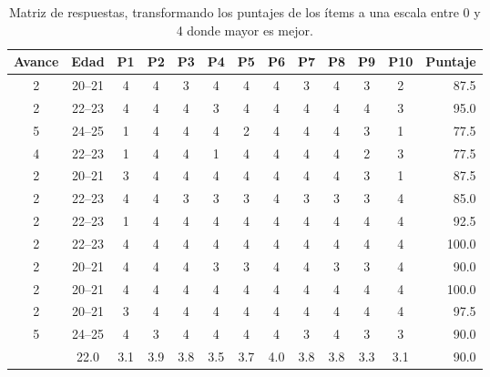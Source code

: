 \begin{table}[hbt]
    \caption[Matriz de respuestas]{Matriz de respuestas, transformando los puntajes de los ítems a una escala entre 0 y 4 donde mayor es mejor.}
    \label{tab:respuestas}
    \centering
    \begin{tabular}{@{}ccccccccccccr@{}}
    \toprule
    \textbf{Avance} & \textbf{Edad} & \textbf{P1}  & \textbf{P2}  & \textbf{P3}  & \textbf{P4}  & \textbf{P5}  & \textbf{P6}  & \textbf{P7}  & \textbf{P8}  & \textbf{P9}  & \textbf{P10} & \textbf{Puntaje} \\ \midrule
    2      & 20--21   & 4   & 4   & 3   & 4   & 4   & 4   & 3   & 4   & 3   & 2   & 87.5    \\
    2      & 22--23   & 4   & 4   & 4   & 3   & 4   & 4   & 4   & 4   & 4   & 3   & 95.0    \\
    5      & 24--25   & 1   & 4   & 4   & 4   & 2   & 4   & 4   & 4   & 3   & 1   & 77.5    \\
    4      & 22--23   & 1   & 4   & 4   & 1   & 4   & 4   & 4   & 4   & 2   & 3   & 77.5    \\
    2      & 20--21   & 3   & 4   & 4   & 4   & 4   & 4   & 4   & 4   & 3   & 1   & 87.5    \\
    2      & 22--23   & 4   & 4   & 3   & 3   & 3   & 4   & 3   & 3   & 3   & 4   & 85.0    \\
    2      & 22--23   & 1   & 4   & 4   & 4   & 4   & 4   & 4   & 4   & 4   & 4   & 92.5    \\
    2      & 22--23   & 4   & 4   & 4   & 4   & 4   & 4   & 4   & 4   & 4   & 4   & 100.0   \\
    2      & 20--21   & 4   & 4   & 4   & 3   & 3   & 4   & 4   & 3   & 3   & 4   & 90.0    \\
    2      & 20--21   & 4   & 4   & 4   & 4   & 4   & 4   & 4   & 4   & 4   & 4   & 100.0   \\
    2      & 20--21   & 3   & 4   & 4   & 4   & 4   & 4   & 4   & 4   & 4   & 4   & 97.5    \\
    5      & 24--25   & 4   & 3   & 4   & 4   & 4   & 4   & 3   & 4   & 3   & 3   & 90.0    \\ \addlinespace[3pt]
    2.7    & 22.0 & 3.1 & 3.9 & 3.8 & 3.5 & 3.7 & 4.0 & 3.8 & 3.8 & 3.3 & 3.1 & 90.0    \\ \bottomrule
    \end{tabular}
\end{table}

